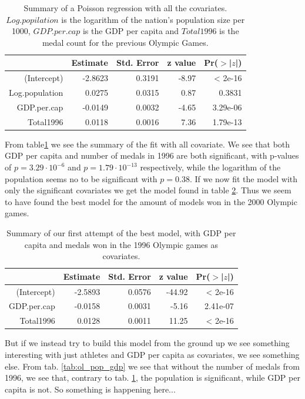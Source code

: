 \documentclass[a4paper,norsk, 10pt]{article}
\begin{document}
\begin{table}[!htb]
\centering
\begin{tabular}{rrrrr}
  \hline
 & Estimate & Std. Error & z value & Pr($>$|$z$|) \\ 
  \hline
(Intercept) & -2.8623 & 0.3191 & -8.97 & < 2e-16 \\ 
  Log.population & 0.0275 & 0.0315 & 0.87 & 0.3831 \\ 
  GDP.per.cap & -0.0149 & 0.0032 & -4.65 & 3.29e-06 \\ 
  Total1996 & 0.0118 & 0.0016 & 7.36 & 1.79e-13 \\ 
   \hline
\end{tabular}
\caption{Summary of a Poisson regression with all the covariates. $Log.popilation$ is the logarithm of the nation's population size per 1000, $GDP.per.cap$ is the GDP per capita and $Total1996$ is the medal count for the previous Olympic Games.}\label{tab:ol_full_it}
\end{table}


From table\ref{tab:ol_full_it} we see the summary of the fit with all covariate. We see that both GDP per capita and number of medals in 1996 are both significant, with p-values of $p=3.29\cdot 10^{-6}$ and $p=1.79\cdot 10^{-13}$ respectively, while the logarithm of the population seems no to be significant with $p = 0.38$. If we now fit the model with only the significant covariates we get the model found in table \ref{tab:ol_96_gdp}. Thus we seem to have found the best model for the amount of models won in the 2000 Olympic games. 

\begin{table}[!htb]
\centering
\begin{tabular}{rrrrr}
  \hline
 & Estimate & Std. Error & z value & Pr($>$|$z$|) \\ 
  \hline
(Intercept) & -2.5893 & 0.0576 & -44.92 & < 2e-16 \\ 
  GDP.per.cap & -0.0158 & 0.0031 & -5.16 & 2.41e-07 \\ 
  Total1996 & 0.0128 & 0.0011 & 11.25 & < 2e-16 \\ 
   \hline
\end{tabular}
\caption{Summary of our first attempt of the best model, with GDP per capita and medals won in the 1996 Olympic games as covariates.}\label{tab:ol_96_gdp}
\end{table}

But if we instead try to build this model from the ground up we see something interesting with just athletes and GDP per capita as covariates, we see something else. From tab. \ref{tab:ol_pop_gdp} we see that without the number of medals from 1996, we see that, contrary to tab. \ref{tab:ol_full_it}, the population is significant, while GDP per capita is not. So something is happening here...
\end{document}
